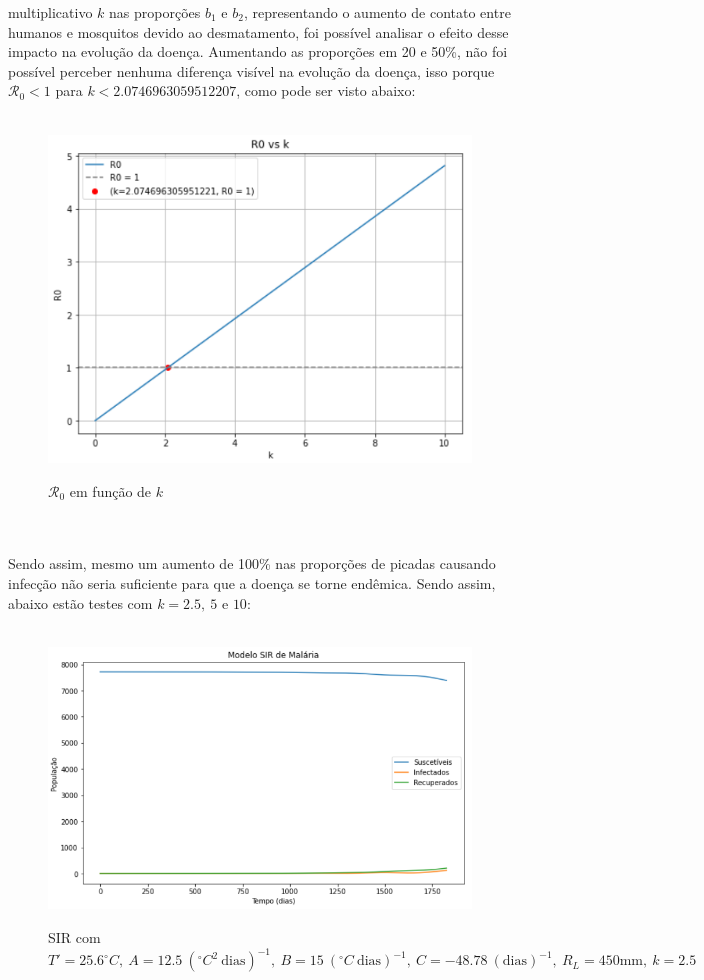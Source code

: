 \documentclass[12pt]{article}
\begin{document}
multiplicativo $k$ nas proporções $b_1$ e $b_2$, representando o aumento de contato
entre humanos e mosquitos devido ao desmatamento, foi possível analisar o efeito desse impacto
na evolução da doença. Aumentando as proporções em 20 e 50\%, não foi possível perceber
nenhuma diferença visível na evolução da doença, isso porque $\mathcal{R}_0 < 1$  
para $k < 2.0746963059512207$, como pode ser visto abaixo:
\begin{figure}[!ht]
        \centering
        \hbox{\hspace{3em} \includegraphics[scale=0.8] {Plot_R0_vs_k.png}}
        \caption{$\mathcal{R}_0$ em função de $k$}
\end{figure} 
\\\\
Sendo assim, mesmo um aumento de 100\% nas proporções de picadas causando infecção
não seria suficiente para que a doença se torne endêmica. Sendo assim, 
abaixo estão testes com $k=2.5, \ 5$ e $10$:
\begin{figure}[!ht]
        \centering
        \hbox{\hspace{2.0em} \includegraphics[scale=0.7] {Correcao_SIR_Desmat_k=2_5.png}}
        \caption{SIR com $T'=25.6 ^\circ C, \ A=12.5 \ (^\circ C^2 \ \text{dias})^{-1}, \ B=15 \ (^\circ C \ \text{dias})^{-1}, \ C=-48.78 \ (\text{dias})^{-1}, \ R_L=450 \text{mm}, \ k=2.5$}
\end{figure} 
\end{document}
